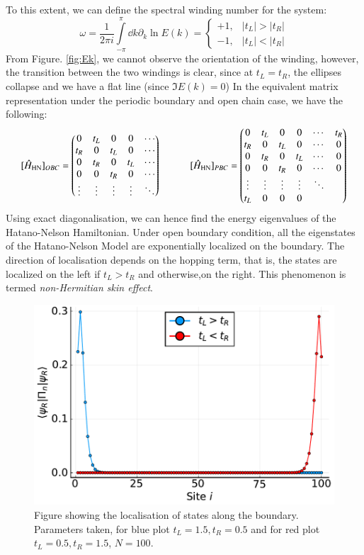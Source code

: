 To this extent, we can define the spectral winding number for the system:
$$\omega = \frac{1}{2\pi i}\int\limits_{-\pi}^{\pi}\dd k \partial_k \ln E(k) = \begin{cases}
    +1, & |t_L|>|t_R|\\
    -1, & |t_L|<|t_R|
\end{cases}$$
From Figure. \ref{fig:Ek}, we cannot observe the orientation of the winding, however, the transition between the two windings is clear, since at $t_L=t_R$, the ellipses collapse and we have a flat line (since $\Im E(k) = 0$)
In the equivalent matrix representation under the periodic boundary and open chain case, we have the following:
\[
[{\hat H}_{\rm{HN}}]_{OBC} = 
\begin{pmatrix}
0 & t_L& 0 & 0 &\cdots\\
t_R& 0& t_L& 0 &\cdots\\
0 & t_R & 0& t_L &\cdots\\
0 & 0 & t_R& 0& \cdots\\
\vdots& \vdots& \vdots& \vdots &\ddots
\end{pmatrix} \qquad \quad  
[{\hat H}_{\rm{HN}}]_{PBC} = 
\begin{pmatrix}
0 & t_L& 0 & 0 &\cdots &t_R\\
t_R& 0& t_L& 0 &\cdots & 0\\
0 & t_R & 0& t_L &\cdots &0\\
0 & 0 & t_R& 0& \cdots &0\\
\vdots& \vdots& \vdots& \vdots &\ddots \\
t_L & 0 &0&0
\end{pmatrix}
\]
Using exact diagonalisation, we can hence find the energy eigenvalues of the Hatano-Nelson Hamiltonian. Under open boundary condition, all the eigenstates of the Hatano-Nelson Model are exponentially localized on the boundary. The direction of localisation depends on the hopping term, that is, the states are localized on the left if $t_L>t_R$ and otherwise,on the right. This phenomenon is termed \textit{non-Hermitian skin effect}.
\begin{figure}[H]
    \centering
    \includegraphics[scale=0.5]{FIGS_MANUS_NHSE/HN_skin.pdf} 
    \caption{Figure showing the localisation of states along the boundary. Parameters taken, for blue plot $t_L =1.5, t_R=0.5$ and for red plot  $t_L =0.5, t_R=1.5$, $N=100$.}
\end{figure}
